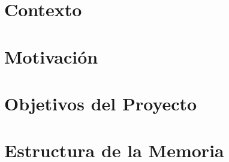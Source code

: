 \section{Contexto}
\cite{Shahbaba2011}


\section{Motivación}

\section{Objetivos del Proyecto}

\section{Estructura de la Memoria}